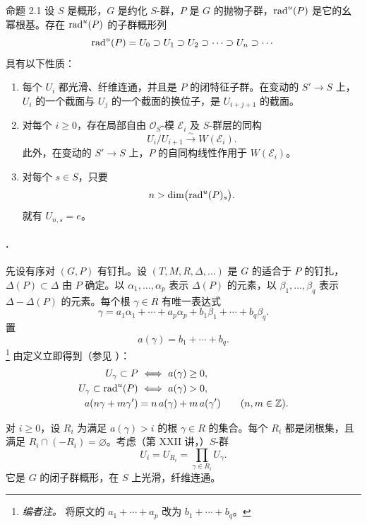 \begin{sgastatement}{命题 2.1}
设 \(S\) 是概形，\(G\) 是约化 \(S\)-群，\(P\) 是 \(G\) 的抛物子群，\(\operatorname{rad}^u(P)\) 是它的幺幂根基。存在 \(\operatorname{rad}^u(P)\) 的子群概形列
\[
 \operatorname{rad}^u(P)=U_0\supset U_1\supset U_2\supset\cdots
 \supset U_n\supset\cdots
\]
具有以下性质：
\begin{enumerate}[label=\textup{(\roman*)}]
\item 每个 \(U_i\) 都光滑、纤维连通，并且是 \(P\) 的闭特征子群。在变动的 \(S'\to S\) 上，\(U_i\) 的一个截面与 \(U_j\) 的一个截面的换位子，是 \(U_{i+j+1}\) 的截面。
\item 对每个 \(i\geq0\)，存在局部自由 \(\mathcal O_S\)-模 \(\mathcal E_i\) 及 \(S\)-群层的同构
\[
 U_i/U_{i+1}\xrightarrow{\sim}W(\mathcal E_i).
\]
此外，在变动的 \(S'\to S\) 上，\(P\) 的自同构线性作用于 \(W(\mathcal E_i)\)。
\item 对每个 \(s\in S\)，只要
\[
 n>\dim\bigl(\operatorname{rad}^u(P)_s\bigr).
\]
就有 \(U_{n,s}=e\)。
\end{enumerate}
\end{sgastatement}

\paragraph{.}
先设有序对 \((G,P)\) 有钉扎。设 \((T,M,R,\Delta,\ldots)\) 是 \(G\) 的适合于 \(P\) 的钉扎，\(\Delta(P)\subset\Delta\) 由 \(P\) 确定。以 \(\alpha_1,\ldots,\alpha_p\) 表示 \(\Delta(P)\) 的元素，以 \(\beta_1,\ldots,\beta_q\) 表示 \(\Delta-\Delta(P)\) 的元素。每个根 \(\gamma\in R\) 有唯一表达式
\[
 \gamma
 =a_1\alpha_1+\cdots+a_p\alpha_p
  +b_1\beta_1+\cdots+b_q\beta_q.
\]
置
\[
 a(\gamma)=b_1+\cdots+b_q.
\tag{7}\label{sga3:xxvi:proposition:2-1:equation:7}
\]
\footnote{\emph{编者注。} 将原文的 \(a_1+\cdots+a_p\) 改为 \(b_1+\cdots+b_q\)。}
由定义立即得到（参见 ）：
\[
\begin{aligned}
 U_\gamma\subset P
   &\ \Longleftrightarrow\ a(\gamma)\geq0,\\
 U_\gamma\subset\operatorname{rad}^u(P)
   &\ \Longleftrightarrow\ a(\gamma)>0,\\
 a(n\gamma+m\gamma')
   &=n\,a(\gamma)+m\,a(\gamma')
   \qquad(n,m\in\mathbb Z).
\end{aligned}
\]

对 \(i\geq0\)，设 \(R_i\) 为满足 \(a(\gamma)>i\) 的根 \(\gamma\in R\) 的集合。每个 \(R_i\) 都是闭根集，且满足 \(R_i\cap(-R_i)=\varnothing\)。考虑（第 XXII 讲，）\(S\)-群
\[
 U_i=U_{R_i}=\prod_{\gamma\in R_i}U_\gamma.
\]
它是 \(G\) 的闭子群概形，在 \(S\) 上光滑，纤维连通。

